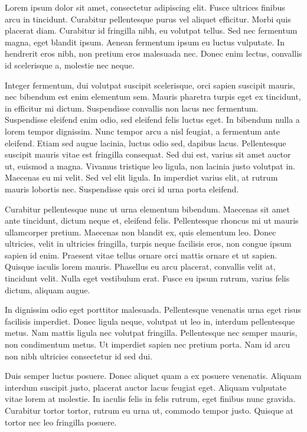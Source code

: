 Lorem ipsum dolor sit amet, consectetur adipiscing elit. Fusce ultrices finibus arcu in tincidunt.
Curabitur pellentesque purus vel aliquet efficitur. Morbi quis placerat diam. Curabitur id fringilla
nibh, eu volutpat tellus. Sed nec fermentum magna, eget blandit ipsum. Aenean fermentum ipsum eu
luctus vulputate. In hendrerit eros nibh, non pretium eros malesuada nec. Donec enim lectus, convallis
id scelerisque a, molestie nec neque.

Integer fermentum, dui volutpat suscipit scelerisque, orci sapien suscipit mauris, nec bibendum est
enim elementum sem. Mauris pharetra turpis eget ex tincidunt, in efficitur mi dictum. Suspendisse
convallis non lacus nec fermentum. Suspendisse eleifend enim odio, sed eleifend felis luctus eget.
In bibendum nulla a lorem tempor dignissim. Nunc tempor arcu a nisl feugiat, a fermentum ante eleifend.
Etiam sed augue lacinia, luctus odio sed, dapibus lacus. Pellentesque suscipit mauris vitae est
fringilla consequat. Sed dui est, varius sit amet auctor ut, euismod a magna. Vivamus tristique leo
ligula, non lacinia justo volutpat in. Maecenas eu mi velit. Sed vel elit ligula. In imperdiet varius
elit, at rutrum mauris lobortis nec. Suspendisse quis orci id urna porta eleifend.

Curabitur pellentesque nunc ut urna elementum bibendum. Maecenas sit amet ante tincidunt, dictum
neque et, eleifend felis. Pellentesque rhoncus mi ut mauris ullamcorper pretium. Maecenas non blandit
ex, quis elementum leo. Donec ultricies, velit in ultricies fringilla, turpis neque facilisis eros,
non congue ipsum sapien id enim. Praesent vitae tellus ornare orci mattis ornare et ut sapien. Quisque
iaculis lorem mauris. Phasellus eu arcu placerat, convallis velit at, tincidunt velit. Nulla eget
vestibulum erat. Fusce eu ipsum rutrum, varius felis dictum, aliquam augue.

In dignissim odio eget porttitor malesuada. Pellentesque venenatis urna eget risus facilisis
imperdiet. Donec ligula neque, volutpat ut leo in, interdum pellentesque metus. Nam mattis ligula
nec volutpat fringilla. Pellentesque nec semper mauris, non condimentum metus. Ut imperdiet sapien
nec pretium porta. Nam id arcu non nibh ultricies consectetur id sed dui.

Duis semper luctus posuere. Donec aliquet quam a ex posuere venenatis. Aliquam interdum suscipit
justo, placerat auctor lacus feugiat eget. Aliquam vulputate vitae lorem at molestie. In iaculis
felis in felis rutrum, eget finibus nunc gravida. Curabitur tortor tortor, rutrum eu urna ut, commodo
tempor justo. Quisque at tortor nec leo fringilla posuere.


